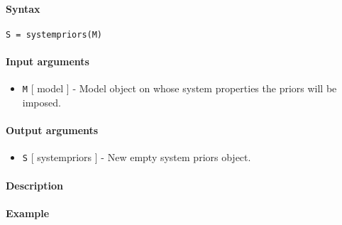 


	\paragraph{Syntax}

\begin{verbatim}
S = systempriors(M)
\end{verbatim}

\paragraph{Input arguments}

\begin{itemize}
\itemsep1pt\parskip0pt
\item
  \texttt{M} {[} model {]} - Model object on whose system properties the
  priors will be imposed.
\end{itemize}

\paragraph{Output arguments}

\begin{itemize}
\itemsep1pt\parskip0pt
\item
  \texttt{S} {[} systempriors {]} - New empty system priors object.
\end{itemize}

\paragraph{Description}

\paragraph{Example}


